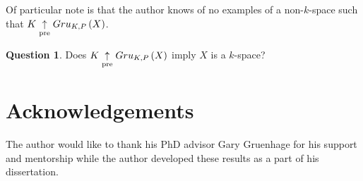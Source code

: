 \documentclass{amsart}
\theoremstyle{definition}
\newtheorem{question}[theorem]{Question}
\begin{document}
Of particular note is that the author knows of no examples of a
non-\(k\)-space such that \(K\underset{\text{pre}}{\uparrow}Gru_{K,P}\left({X}\right)\).

\begin{question}
  Does \(K\underset{\text{pre}}{\uparrow}Gru_{K,P}\left({X}\right)\) imply \(X\) is a \(k\)-space?
\end{question}




\section{Acknowledgements}

The author would like to thank his PhD advisor Gary Gruenhage for his
support and mentorship while the author developed these results as a part of
his dissertation.




\end{document}
